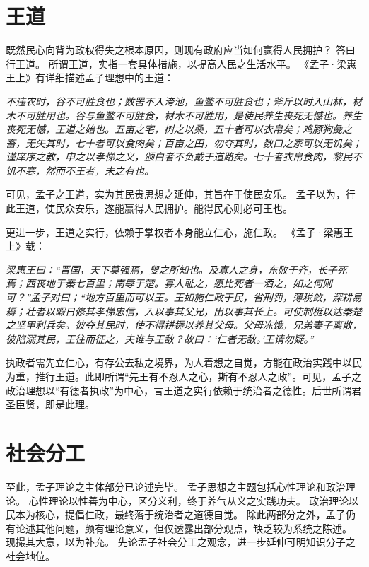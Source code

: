 \documentclass[11pt]{article}
\begin{document}
\section{王道}
既然民心向背为政权得失之根本原因，则现有政府应当如何赢得人民拥护？
答曰行王道。
所谓王道，实指一套具体措施，以提高人民之生活水平。
《孟子·梁惠王上》有详细描述孟子理想中的王道：
  
\textit{不违农时，谷不可胜食也；数罟不入洿池，鱼鳖不可胜食也；斧斤以时入山林，材木不可胜用也。谷与鱼鳖不可胜食，材木不可胜用，是使民养生丧死无憾也。养生丧死无憾，王道之始也。五亩之宅，树之以桑，五十者可以衣帛矣；鸡豚狗彘之畜，无失其时，七十者可以食肉矣；百亩之田，勿夺其时，数口之家可以无饥矣；谨庠序之教，申之以孝悌之义，颁白者不负戴于道路矣。七十者衣帛食肉，黎民不饥不寒，然而不王者，未之有也。}

可见，孟子之王道，实为其民贵思想之延伸，其旨在于使民安乐。
孟子以为，行此王道，使民众安乐，遂能赢得人民拥护。能得民心则必可王也。

\newline

更进一步，王道之实行，依赖于掌权者本身能立仁心，施仁政。
《孟子·梁惠王上》载：

\textit{梁惠王曰：“晋国，天下莫强焉，叟之所知也。及寡人之身，东败于齐，长子死焉；西丧地于秦七百里；南辱于楚。寡人耻之，愿比死者一洒之，如之何则可？”孟子对曰；“地方百里而可以王。王如施仁政于民，省刑罚，薄税敛，深耕易耨；壮者以暇日修其孝悌忠信，入以事其父兄，出以事其长上。可使制梃以达秦楚之坚甲利兵矣。彼夺其民时，使不得耕耨以养其父母。父母冻饿，兄弟妻子离散，彼陷溺其民，王往而征之，夫谁与王敌？故曰：‘仁者无敌。’王请勿疑。”}

执政者需先立仁心，有存公去私之境界，为人着想之自觉，方能在政治实践中以民为重，推行王道。此即所谓“先王有不忍人之心，斯有不忍人之政”。可见，孟子之政治理想以“有德者执政”为中心，言王道之实行依赖于统治者之德性。后世所谓君圣臣贤，即是此理。
  
\section{社会分工}
至此，孟子理论之主体部分已论述完毕。
孟子思想之主题包括心性理论和政治理论。
心性理论以性善为中心，区分义利，终于养气从义之实践功夫。
政治理论以民本为核心，提倡仁政，最终落于统治者之道德自觉。
除此两部分之外，孟子仍有论述其他问题，颇有理论意义，但仅透露出部分观点，缺乏较为系统之陈述。
现撮其大意，以为补充。
先论孟子社会分工之观念，进一步延伸可明知识分子之社会地位。

\newline
\end{document}
